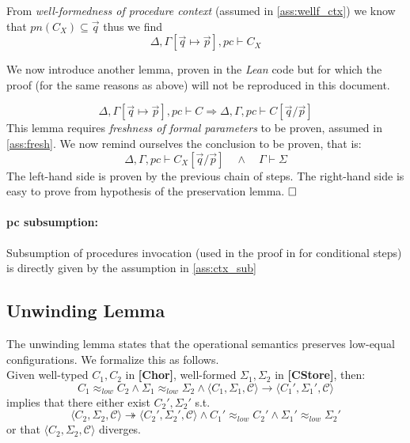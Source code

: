 \documentclass[12pt,a4paper,twoside]{book}
\newcommand{\qed}{\hfill\square}
\begin{document}
From \emph{well-formedness of procedure context} (assumed in \ref{ass:wellf_ctx})
we know that $pn(C_X) \subseteq \vec{q}$ thus we find
$$
\Delta,\Gamma[\vec{q}\mapsto\vec{p}],pc \vdash C_X
$$

We now introduce another lemma, proven in the \emph{Lean} code but for which the proof (for the same reasons as above) will not be reproduced in this document.\label{aux:pres_lemma1}

\begin{equation*}
\Delta, \Gamma[\vec{q}\mapsto\vec{p}], pc \vdash C \Rightarrow
\Delta, \Gamma, pc \vdash C[\vec{q}/\vec{p}]
\end{equation*}
This lemma requires \emph{freshness of formal parameters} to be proven, assumed in \ref{ass:fresh}.
We now remind ourselves the conclusion to be proven, that is:
$$
\Delta, \Gamma, pc \vdash C_X[\vec{q}/\vec{p}]\quad\land\quad \Gamma \vdash \Sigma
$$
The left-hand side is proven by the previous chain of steps.
The right-hand side is easy to prove from hypothesis of the preservation lemma.
$\qed$

\paragraph{pc subsumption:}
Subsumption of procedures invocation (used in the proof in \cite{myers2011proving} for conditional steps) is directly given by the assumption in \ref{ass:ctx_sub}

\subsection{Unwinding Lemma}
The unwinding lemma states that the operational semantics preserves low-equal configurations. We formalize this as follows.\\
Given well-typed $C_1,C_2$ in \textbf{[Chor]}, well-formed $\Sigma_1, \Sigma_2$ in \textbf{[CStore]}, then:
$$
C_1 \approx_{low} C_2 \land
\Sigma_1 \approx_{low} \Sigma_2 \land
\langle C_1, \Sigma_1, \mathscr{C} \rangle \rightarrow
\langle C_1', \Sigma_1', \mathscr{C} \rangle
$$
implies that there either exist $C_2',\Sigma_2'$ s.t.
\begin{equation}\label{aux:unw}
\langle C_2, \Sigma_2, \mathscr{C} \rangle \twoheadrightarrow
\langle C_2', \Sigma_2', \mathscr{C} \rangle
\land C_1' \approx_{low} C_2'
\land \Sigma_1' \approx_{low} \Sigma_2'
\end{equation}
or that $\langle C_2, \Sigma_2, \mathscr{C}\rangle$ diverges.
\end{document}
